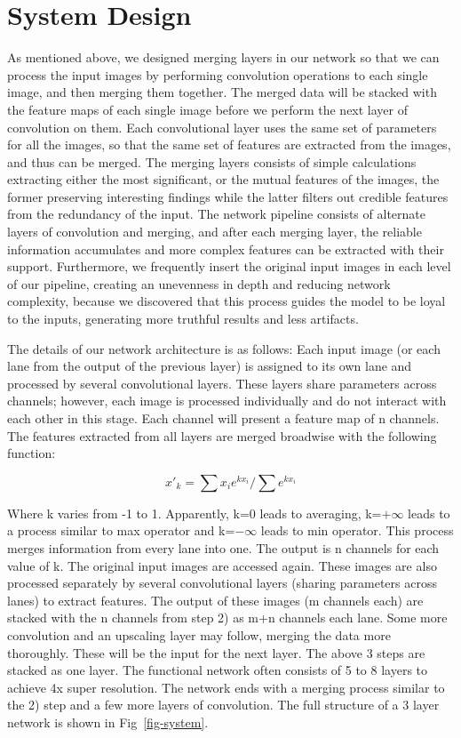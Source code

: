 \section{System Design}
\label{sec-design}
As mentioned above, we designed merging layers in our network so that we can process the input images by performing convolution operations to each single image, and then merging them together. The merged data will be stacked with the feature maps of each single image before we perform the next layer of convolution on them. Each convolutional layer uses the same set of parameters for all the images, so that the same set of features are extracted from the images, and thus can be merged. The merging layers consists of simple calculations extracting either the most significant, or the mutual features of the images, the former preserving interesting findings while the latter filters out credible features from the redundancy of the input. The network pipeline consists of alternate layers of convolution and merging, and after each merging layer, the reliable information accumulates and more complex features can be extracted with their support. Furthermore, we frequently insert the original input images in each level of our pipeline, creating an unevenness in depth and reducing network complexity, because we discovered that this process guides the model to be loyal to the inputs, generating more truthful results and less artifacts.

The details of our network architecture is as follows:
	Each input image (or each lane from the output of the previous layer) is assigned to its own lane and processed by several convolutional layers. These layers share parameters across channels; however, each image is processed individually and do not interact with each other in this stage. Each channel will present a feature map of n channels.
	The features extracted from all layers are merged broadwise with the following function:


    $${x'_k=\sum x_ie^{kx_i}/\sum e^{kx_i}}$$


Where k varies from -1 to 1. Apparently, k=0 leads to averaging, k=${+\infty}$ leads to a process similar to max operator and k=${-\infty}$ leads to min operator. This process merges information from every lane into one. The output is n channels for each value of k. 
	The original input images are accessed again. These images are also processed separately by several convolutional layers (sharing parameters across lanes) to extract features. The output of these images (m channels each) are stacked with the n channels from step 2) as m+n channels each lane. Some more convolution and an upscaling layer may follow, merging the data more thoroughly. These will be the input for the next layer.
The above 3 steps are stacked as one layer. The functional network often consists of 5 to 8 layers to achieve 4x super resolution. The network ends with a merging process similar to the 2) step and a few more layers of convolution. The full structure of a 3 layer network is shown in Fig~\ref{fig-system}.

